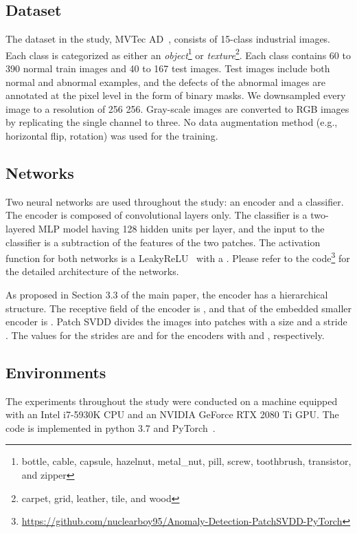 \documentclass[runningheads]{llncs}
\begin{document}
\subsection{Dataset}
The dataset in the study, MVTec AD~\cite{mvtecad}, consists of 15-class industrial images.
Each class is categorized as either an \textit{object}\footnote{bottle, cable, capsule, hazelnut, metal\_nut, pill, screw, toothbrush, transistor, and zipper} or \textit{texture}\footnote{carpet, grid, leather, tile, and wood}.
Each class contains 60 to 390 normal train images and 40 to 167 test images.
Test images include both normal and abnormal examples, and the defects of the abnormal images are annotated at the pixel level in the form of binary masks.
We downsampled every image to a resolution of 256  256.
Gray-scale images are converted to RGB images by replicating the single channel to three.
No data augmentation method (e.g., horizontal flip, rotation) was used for the training.

\subsection{Networks}
Two neural networks are used throughout the study: an encoder and a classifier.
The encoder is composed of convolutional layers only.
The classifier is a two-layered MLP model having 128 hidden units per layer, and the input to the classifier is a subtraction of the features of the two patches.
The activation function for both networks is a LeakyReLU~\cite{relu} with a .
Please refer to the code\footnote{\url{https://github.com/nuclearboy95/Anomaly-Detection-PatchSVDD-PyTorch}} for the detailed architecture of the networks.

As proposed in Section 3.3 of the main paper, the encoder has a hierarchical structure.
The receptive field of the encoder is , and that of the embedded smaller encoder is .
Patch SVDD divides the images into patches with a size  and a stride .
The values for the strides are  and  for the encoders with  and , respectively.

\subsection{Environments}

The experiments throughout the study were conducted on a machine equipped with an Intel i7-5930K CPU and an NVIDIA GeForce RTX 2080 Ti GPU.
The code is implemented in python 3.7 and PyTorch~\cite{pytorch}.
 
\end{document}
